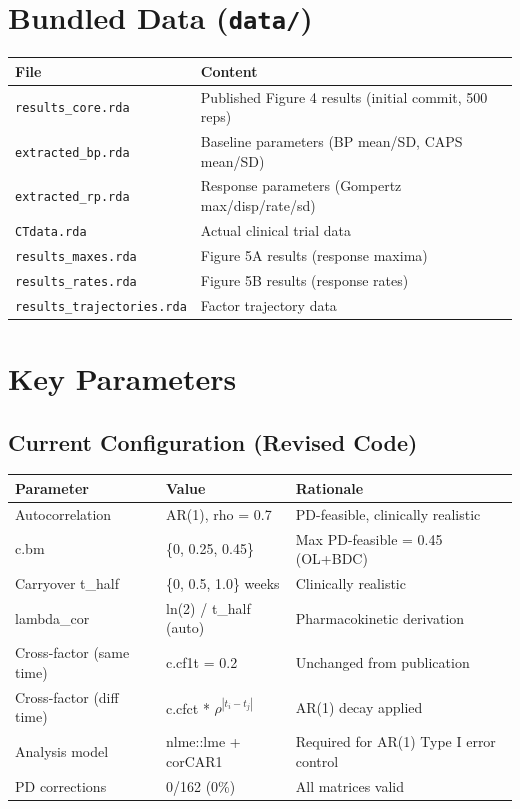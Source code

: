 \documentclass[11pt]{article}
\begin{document}
\section{Bundled Data (\texttt{data/})}

\begin{table}[h]
\centering
\begin{tabular}{ll}
\toprule
File & Content \\
\midrule
\texttt{results\_core.rda} & Published Figure 4 results (initial commit, 500 reps) \\
\texttt{extracted\_bp.rda} & Baseline parameters (BP mean/SD, CAPS mean/SD) \\
\texttt{extracted\_rp.rda} & Response parameters (Gompertz max/disp/rate/sd) \\
\texttt{CTdata.rda} & Actual clinical trial data \\
\texttt{results\_maxes.rda} & Figure 5A results (response maxima) \\
\texttt{results\_rates.rda} & Figure 5B results (response rates) \\
\texttt{results\_trajectories.rda} & Factor trajectory data \\
\bottomrule
\end{tabular}
\end{table}

\section{Key Parameters}

\subsection{Current Configuration (Revised Code)}

\begin{table}[h]
\centering
\begin{tabular}{lll}
\toprule
Parameter & Value & Rationale \\
\midrule
Autocorrelation & AR(1), rho = 0.7 & PD-feasible, clinically realistic \\
c.bm & \{0, 0.25, 0.45\} & Max PD-feasible = 0.45 (OL+BDC) \\
Carryover t\_half & \{0, 0.5, 1.0\} weeks & Clinically realistic \\
lambda\_cor & ln(2) / t\_half (auto) & Pharmacokinetic derivation \\
Cross-factor (same time) & c.cf1t = 0.2 & Unchanged from publication \\
Cross-factor (diff time) & c.cfct * $\rho^{|t_i-t_j|}$ & AR(1) decay applied \\
Analysis model & nlme::lme + corCAR1 & Required for AR(1) Type I error control \\
PD corrections & 0/162 (0\%) & All matrices valid \\
\bottomrule
\end{tabular}
\end{table}
\end{document}
